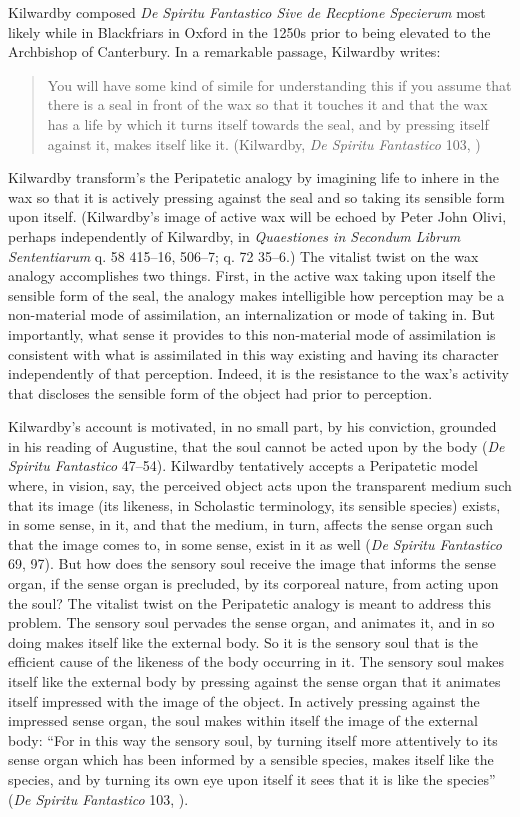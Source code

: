 Kilwardby composed \emph{De Spiritu Fantastico Sive de Recptione Specierum} most likely while in Blackfriars in Oxford in the 1250s prior to being elevated to the Archbishop of Canterbury. In a remarkable passage, Kilwardby writes:
\begin{quote}
	You will have some kind of simile for understanding this if you assume that there is a seal in front of the wax so that it touches it and that the wax has a life by which it turns itself towards the seal, and by pressing itself against it, makes itself like it. (Kilwardby, \emph{De Spiritu Fantastico} 103, \citealt[94]{Broadie:1993dz})
\end{quote}
Kilwardby transform's the Peripatetic analogy by imagining life to inhere in the wax so that it is actively pressing against the seal and so taking its sensible form upon itself. (Kilwardby's image of active wax will be echoed by Peter John Olivi, perhaps independently of Kilwardby, in \emph{Quaestiones in Secondum Librum Sententiarum} q. 58 415--16, 506--7; q. 72 35--6.) The vitalist twist on the wax analogy accomplishes two things. First, in the active wax taking upon itself the sensible form of the seal, the analogy makes intelligible how perception may be a non-material mode of assimilation, an internalization or mode of taking in. But importantly, what sense it provides to this non-material mode of assimilation is consistent with what is assimilated in this way existing and having its character independently of that perception. Indeed, it is the resistance to the wax's activity that discloses the sensible form of the object had prior to perception.

Kilwardby's account is motivated, in no small part, by his conviction, grounded in his reading of Augustine, that the soul cannot be acted upon by the body (\emph{De Spiritu Fantastico} 47--54). Kilwardby tentatively accepts a Peripatetic model where, in vision, say, the perceived object acts upon the transparent medium such that its image (its likeness, in Scholastic terminology, its sensible species) exists, in some sense, in it, and that the medium, in turn, affects the sense organ such that the image comes to, in some sense, exist in it as well (\emph{De Spiritu Fantastico} 69, 97). But how does the sensory soul receive the image that informs the sense organ, if the sense organ is precluded, by its corporeal nature, from acting upon the soul? The vitalist twist on the Peripatetic analogy is meant to address this problem. The sensory soul pervades the sense organ, and animates it, and in so doing makes itself like the external body. So it is the sensory soul that is the efficient cause of the likeness of the body occurring in it. The sensory soul makes itself like the external body by pressing against the sense organ that it animates itself impressed with the image of the object. In actively pressing against the impressed sense organ, the soul makes within itself the image of the external body: ``For in this way the sensory soul, by turning itself more attentively to its sense organ which has been informed by a sensible species, makes itself like the species, and by turning its own eye upon itself it sees that it is like the species'' (\emph{De Spiritu Fantastico} 103, \citealt[94]{Broadie:1993dz}).

